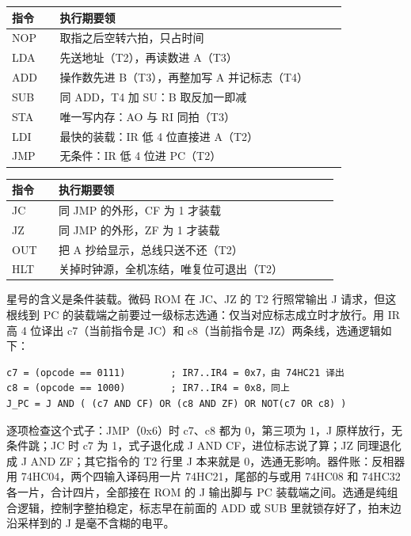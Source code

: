 \begin{longtable}{L{0.12\linewidth}L{0.72\linewidth}}
\toprule
指令 & 执行期要领 \\
\midrule
NOP & 取指之后空转六拍，只占时间 \\\tablerowrule
LDA & 先送地址（T2），再读数进 A（T3） \\\tablerowrule
ADD & 操作数先进 B（T3），再整加写 A 并记标志（T4） \\\tablerowrule
SUB & 同 ADD，T4 加 SU：B 取反加一即减 \\\tablerowrule
STA & 唯一写内存：AO 与 RI 同拍（T3） \\\tablerowrule
LDI & 最快的装载：IR 低 4 位直接进 A（T2） \\\tablerowrule
JMP & 无条件：IR 低 4 位进 PC（T2） \\
\bottomrule
\end{longtable}

\begin{longtable}{L{0.12\linewidth}L{0.72\linewidth}}
\toprule
指令 & 执行期要领 \\
\midrule
JC & 同 JMP 的外形，CF 为 1 才装载 \\\tablerowrule
JZ & 同 JMP 的外形，ZF 为 1 才装载 \\\tablerowrule
OUT & 把 A 抄给显示，总线只送不还（T2） \\\tablerowrule
HLT & 关掉时钟源，全机冻结，唯复位可退出（T2） \\
\bottomrule
\end{longtable}

星号的含义是条件装载。微码 ROM 在 JC、JZ 的 T2 行照常输出 J 请求，但这根线到 PC 的装载端之前要过一级标志选通：仅当对应标志成立时才放行。用 IR 高 4 位译出 c7（当前指令是 JC）和 c8（当前指令是 JZ）两条线，选通逻辑如下：

\begin{lstlisting}
c7 = (opcode == 0111)        ; IR7..IR4 = 0x7，由 74HC21 译出
c8 = (opcode == 1000)        ; IR7..IR4 = 0x8，同上
J_PC = J AND ( (c7 AND CF) OR (c8 AND ZF) OR NOT(c7 OR c8) )
\end{lstlisting}

逐项检查这个式子：JMP（0x6）时 c7、c8 都为 0，第三项为 1，J 原样放行，无条件跳；JC 时 c7 为 1，式子退化成 J AND CF，进位标志说了算；JZ 同理退化成 J AND ZF；其它指令的 T2 行里 J 本来就是 0，选通无影响。器件账：反相器用 74HC04，两个四输入译码用一片 74HC21，尾部的与或用 74HC08 和 74HC32 各一片，合计四片，全部接在 ROM 的 J 输出脚与 PC 装载端之间。选通是纯组合逻辑，控制字整拍稳定，标志早在前面的 ADD 或 SUB 里就锁存好了，拍末边沿采样到的 J 是毫不含糊的电平。

